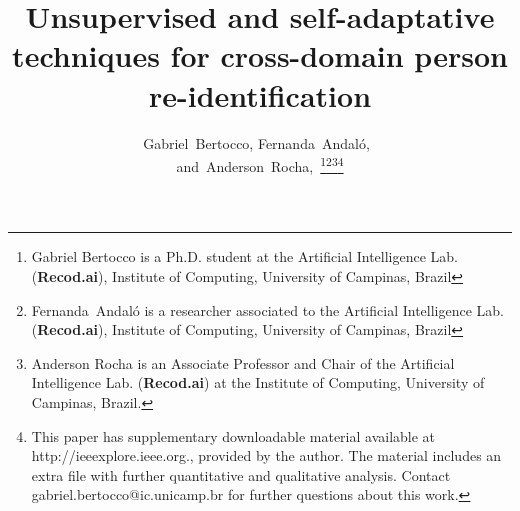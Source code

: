 \documentclass[journal]{IEEEtran}
\begin{document}
\title{Unsupervised and self-adaptative techniques for cross-domain person re-identification}


\author{Gabriel~Bertocco,
        Fernanda~Andal\'{o},~\\
        and~Anderson~Rocha,~\thanks{Gabriel Bertocco is a Ph.D. student at the Artificial Intelligence Lab. (\textbf{Recod.ai}), Institute of Computing, University of Campinas, Brazil}\thanks{Fernanda~Andal\'{o} is a researcher associated to the Artificial Intelligence Lab. (\textbf{Recod.ai}), Institute of Computing, University of Campinas, Brazil}\thanks{Anderson Rocha is an Associate Professor and Chair of the Artificial Intelligence Lab. (\textbf{Recod.ai}) at the Institute of Computing, University of Campinas, Brazil. 
}\thanks{This paper has supplementary downloadable material available at http://ieeexplore.ieee.org., provided by the author. The material includes an extra file with further quantitative and qualitative analysis. Contact gabriel.bertocco@ic.unicamp.br for further questions about this work.}}


















\maketitle
\end{document}
